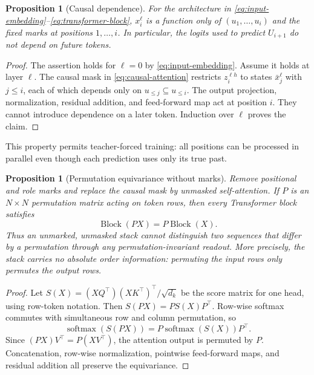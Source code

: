 \documentclass[11pt]{amsart}
\numberwithin{equation}{section}
\theoremstyle{definition}
\theoremstyle{plain}
\newtheorem{proposition}[definition]{Proposition}
\theoremstyle{remark}
\DeclareMathOperator{\softmax}{softmax}
\begin{document}
\begin{proposition}[Causal dependence]
\label{prop:causal-dependence}
For the architecture in \eqref{eq:input-embedding}--\eqref{eq:transformer-block},
$x_i^\ell$ is a function only of $(u_1,\ldots,u_i)$ and the fixed marks at
positions $1,\ldots,i$.  In particular, the logits used to predict $U_{i+1}$
do not depend on future tokens.
\end{proposition}

\begin{proof}
The assertion holds for $\ell=0$ by \eqref{eq:input-embedding}.  Assume it
holds at layer $\ell$.  The causal mask in \eqref{eq:causal-attention} restricts
$z_i^{\ell h}$ to states $\bar x_j^\ell$ with $j\le i$, each of which depends
only on $u_{\le j}\subseteq u_{\le i}$.  The output projection, normalization,
residual addition, and feed-forward map act at position $i$.  They cannot
introduce dependence on a later token.  Induction over $\ell$ proves the claim.
\end{proof}

This property permits teacher-forced training: all positions can be processed
in parallel even though each prediction uses only its true past.

\begin{proposition}[Permutation equivariance without marks]
\label{prop:permutation-equivariance}
Remove positional and role marks and replace the causal mask by unmasked
self-attention.  If $P$ is an $N\times N$ permutation matrix acting on token
rows, then every Transformer block satisfies
\[
 \operatorname{Block}(PX)=P\operatorname{Block}(X).
\]
Thus an unmarked, unmasked stack cannot distinguish two sequences that differ
by a permutation through any permutation-invariant readout.  More precisely,
the stack carries no absolute order information: permuting the input rows only
permutes the output rows.
\end{proposition}

\begin{proof}
Let $S(X)=(XQ^\top)(XK^\top)^\top/\sqrt{d_k}$ be the score matrix for one
head, using row-token notation.  Then $S(PX)=PS(X)P^\top$.  Row-wise softmax
commutes with simultaneous row and column permutation, so
\[
 \softmax(S(PX))=P\softmax(S(X))P^\top.
\]
Since $(PX)V^\top=P(XV^\top)$, the attention output is permuted by $P$.
Concatenation,
row-wise normalization, pointwise feed-forward maps, and residual addition all
preserve the equivariance.
\end{proof}
\end{document}
